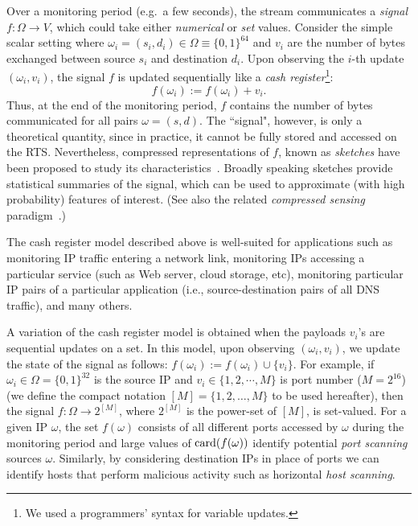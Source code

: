 \documentclass[10pt, conference, letterpaper,onecolumn]{IEEEtranv1.8}
\theoremstyle{plain}\newtheorem{thm}{Theorem}\newtheorem{lem}{Lemma}
\theoremstyle{definition}
\begin{document}
Over a monitoring period (e.g.\ a few seconds), the stream communicates a {\em signal} $f:\Omega \to V$, which could
take either {\em numerical} or {\em set} values. Consider the simple scalar setting where $\omega_i = (s_i,d_i) \in \Omega \equiv \{0,1\}^{64}$ and
$v_i$ are the number of bytes exchanged between source $s_i$ and destination $d_i$. Upon observing the $i$-th update $(\omega_i,v_i)$, 
the signal $f$ is updated sequentially like a {\em cash register}\footnote{We used a programmers' syntax for  variable updates.}:
$$
 f(\omega_i) := f(\omega_i) + v_i.
$$
Thus, at the end of the monitoring period,  $f$ contains the number of bytes communicated for all pairs $\omega=(s,d)$. 
The ``signal", however, is only a theoretical quantity, since in practice, it cannot be fully stored and accessed on the RTS. Nevertheless, compressed representations of $f$, 
known as {\em sketches} have been proposed to study its characteristics~\cite{Cormode:2005:IDS:1073713.1073718, Cormode:2003:FHH:1315451.1315492, Cormode:2004:HUS:1007568.1007575, Gilbert06algorithmiclinear, Krishnamurthy:2003:SCD:948205.948236, 4146856, 1354567, 2190032, Cormode1061325,  Porat:2012:STM:2095116.2095212, doi:10.1137/100816705}. Broadly speaking sketches 
provide statistical summaries of the signal, which can be used to approximate (with high probability) features of interest.  (See also 
the related {\em compressed sensing} paradigm~\cite{4385788, Gilbert:2007:OSF:1250790.1250824, 1614066, Indyk:2008:ECC:1347082.1347086}.)

The cash register model described above is well-suited for applications such as  
monitoring IP traffic entering a network link, monitoring IPs accessing a particular service (such as Web server, cloud storage, etc), monitoring 
particular IP pairs of a particular application (i.e., source-destination pairs of all DNS traffic), and many others. 

A variation of the cash register model is obtained when the payloads $v_i$'s are sequential updates
on a set. In this model, upon observing $(\omega_i,v_i)$, we update the state of the signal as follows:
$f(\omega_i) := f(\omega_i) \cup \{v_i\}$. For example, if $\omega_i \in \Omega =\{0,1\}^{32}$ is the source IP and
$v_i\in \{1,2,\cdots,M\}$ is port number ($M=2^{16}$)
(we define the compact notation $[M]=\{1,2,\ldots,M\}$ to be used hereafter), then the signal $f:\Omega \to 2^{[M]}$, where $ 2^{[M]}$ is the power-set of $[M]$,  is set-valued.
For a given IP $\omega$, the set $f(\omega)$ consists of all different ports accessed by $\omega$ during the monitoring  period and
large values of ${\rm card}(f(\omega))$ identify potential {\em port scanning} sources $\omega$.
Similarly, by considering destination IPs in place of ports we can identify hosts that perform
malicious activity such as horizontal \emph{host scanning}.
\end{document}
